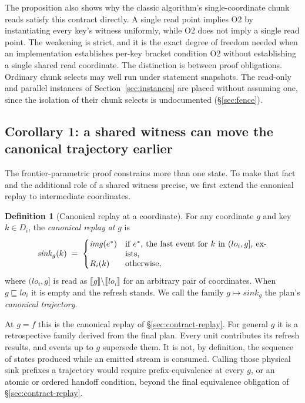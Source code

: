 \documentclass[sigconf,nonacm,10pt]{acmart}
\theoremstyle{plain}
\theoremstyle{definition}
\newtheorem{definition}{Definition}[section]
\newcommand{\den}[1]{\llbracket #1 \rrbracket}   %
\newcommand{\pre}{\sqsubseteq}                   %
\newcommand{\window}[2]{(#1,#2]}                 %
\newcommand{\imgof}{\mathit{img}}                %
\newcommand{\sink}{\mathit{sink}}                %
\begin{document}
The proposition also shows why the classic algorithm's
single-coordinate chunk reads satisfy this contract directly. A
single read point implies O2 by
instantiating every key's witness uniformly, while O2 does not imply
a single read point. The weakening is strict, and it is the exact
degree of freedom needed when an implementation establishes per-key
bracket condition O2 without establishing a single shared read coordinate.
The distinction is between proof obligations. Ordinary chunk selects
may well run under statement snapshots. The read-only and parallel
instances of Section~\ref{sec:instances} are placed without assuming one,
since the isolation of their chunk selects is undocumented
(\S\ref{sec:fence}).

\subsection{Corollary 1: a shared witness can move the canonical
trajectory earlier}\label{sec:theorem-shared}

The frontier-parametric proof constrains more than one state. To make
that fact and the additional role of a shared witness precise, we
first extend the canonical replay to intermediate coordinates.

\begin{definition}[Canonical replay at a coordinate]\label{def:traj}
For any coordinate $g$ and key $k \in D_i$, the \emph{canonical
replay at} $g$ is
\[
\sink_g(k) \;=\;
\begin{cases}
\imgof(e^{\ast}) & \parbox[t]{0.5\columnwidth}{if $e^{\ast}$, the
  last event for $k$ in $\window{lo_i}{g}$, exists,}\\[2pt]
R_i(k) & \text{otherwise,}
\end{cases}
\]
where $\window{lo_i}{g}$ is read as $\den{g} \setminus \den{lo_i}$
for an arbitrary pair of coordinates. When $g \pre lo_i$ it is
empty and the refresh stands. We call the family $g \mapsto \sink_g$
the plan's \emph{canonical trajectory}.
\end{definition}

At $g = f$ this is the canonical replay of
\S\ref{sec:contract-replay}. For general $g$ it is a retrospective
family derived from the final plan. Every unit contributes its
refresh results, and events up to $g$ supersede them. It is not, by
definition, the sequence of states produced while an emitted stream
is consumed. Calling those physical sink prefixes a trajectory would
require prefix-equivalence at every $g$, or an atomic or ordered
handoff condition, beyond the final equivalence obligation of
\S\ref{sec:contract-replay}.
\end{document}
